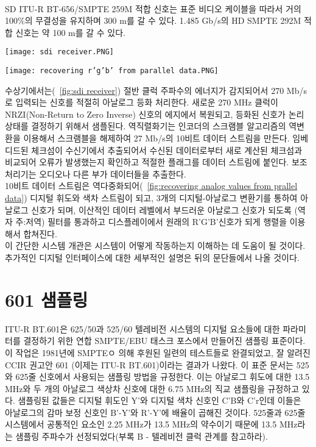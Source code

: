 \\
SD ITU-R BT-656/SMPTE 259M 적합 신호는 표준 비디오 케이블을 따라서 거의 100\%의 무결성을 유지하며 300 m를 갈 수 있다. 1.485 Gb/s의 HD SMPTE 292M 적합 신호는 약 100 m를 갈 수 있다.
\\
\begin{figure*}[!t]
    \centering
    \texttt{[image: sdi receiver.PNG]}
    \caption{SDI 수신기 - 비디오 데이터를 역직렬화하여 다시 병렬로 만든다}\label{fig:sdi receiver}
\end{figure*}
\begin{figure*}[h!]
    \centering
    \texttt{[image: recovering r'g'b' from parallel data.PNG]}
    \caption{병렬 데이터에서 아날로그 R'G'B'를 복원}\label{fig:recovering analog values from prallel data}
\end{figure*}
수상기에서는(\figurename~\ref{fig:sdi receiver}) 절반 클럭 주파수의 에너지가 감지되어서 270 Mb/s로 입력되는 신호를 적절히 아날로그 등화 처리한다. 새로운 270 MHz 클럭이 NRZI(Non-Return to Zero Inverse) 신호의 에지에서 복원되고, 등화된 신호가 논리 상태를 결정하기 위해서 샘플된다.
역직렬화기는 인코더의 스크램블 알고리즘의 역변환을 이용해서 스크램블을 해제하여 27 Mb/s의 10비트 데이터 스트림을 만든다. 임베디드된 체크섬이 수신기에서 추출되어서 수신된 데이터로부터 새로 계산된 체크섬과 비교되어 오류가 발생했는지 확인하고 적절한 플래그를 데이터 스트림에 붙인다.
보조 처리기는 오디오나 다른 부가 데이터들을 추출한다.
\\
10비트 데이터 스트림은 역다중화되어(\figurename~\ref{fig:recovering analog values from prallel data}) 디지털 휘도와 색차 스트림이 되고, 3개의 디지털-아날로그 변환기를 통하여 아날로그 신호가 되며, 이산적인 데이터 레벨에서 부드러운 아날로그 신호가 되도록 (역자 주:저역) 필터를 통과하고 디스플레이에서 원래의 R'G'B'신호가 되게 행렬을 이용해서 합쳐진다.
\\
이 간단한 시스템 개관은 시스템이 어떻게 작동하는지 이해하는 데 도움이 될 것이다. 추가적인 디지털 인터페이스에 대한 세부적인 설명은 뒤의 문단들에서 나올 것이다.

\section{601 샘플링}
ITU-R BT.601은 625/50과 525/60 텔레비전 시스템의 디지털 요소들에 대한 파라미터를 결정하기 위한 연합 SMPTE/EBU 태스크 포스에서 만들어진 샘플링 표준이다.
이 작업은 1981년에 SMPTEㅇ 의해 후원된 일련의 테스트들로 완결되었고, 잘 알려진 CCIR 권고안 601 (이제는 ITU-R BT.601)이라는 결과가 나왔다.
이 표준 문서는 525와 625줄 신호에서 사용되는 샘플링 방법을 규정한다. 이는 아날로그 휘도에 대한 13.5 MHz와 두 개의 아날로그 색상차 신호에 대한 6.75 MHz의 직교 샘플링을 규정하고 있다.
샘플링된 값들은 디지털 휘도인 Y'와 디지털 색차 신호인 C'B와 C'r인데 이들은 아날로그의 감마 보정 신호인 B'-Y'와 R'-Y'에 배율이 곱해진 것이다.
525줄과 625줄 시스템에서 공통적인 요소인 2.25 MHz가 13.5 MHz의 약수이기 때문에 13.5 MHz라는 샘플링 주파수가 선정되었다(부록 B - 텔레비전 클럭 관계를 참고하라).
\\
